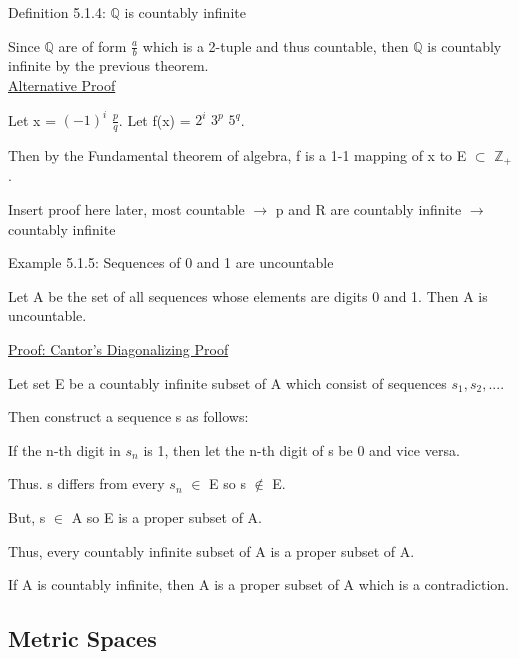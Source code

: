 { \color{blue} Definition 5.1.4: $\mathbb{Q}$ is countably infinite } 

	\begin{adjustbox}{minipage=14cm, right}
		Since $\mathbb{Q}$ are of form $\frac{a}{b}$ which is a 2-tuple and thus countable,
		then $\mathbb{Q}$ is countably infinite by the previous theorem. \\
	\end{adjustbox}
	{ \color{magenta} \underline{Alternative Proof} } 
	
		Let x = $(-1)^i$ $\frac{p}{q}$.  Let f(x) = $2^i$ $3^p$ $5^q$.

		Then by the Fundamental theorem of algebra, f is a 1-1 mapping of
		x to E $\subset$ $\mathbb{Z}_+$.

		{\color{red} Insert proof here later, most countable $\rightarrow$
		p and R are countably infinite $\rightarrow$ countably infinite} \\ 

\newpage

{ \color{purple} Example 5.1.5: Sequences of 0 and 1 are uncountable } 

	\begin{adjustbox}{minipage=14cm, right}
		Let A be the set of all sequences whose elements are digits 0 and 1.
		Then A is uncountable.
	\end{adjustbox}

{ \color{magenta} \underline{Proof: Cantor's Diagonalizing Proof} } 

	Let set E be a countably infinite subset of A which consist of sequences $s_1,s_2,...$.

	Then construct a sequence s as follows:

	\qquad If the n-th digit in $s_n$ is 1, then let the n-th digit of s be 0
	and vice versa.

	Thus. s differs from every $s_n$ $\in$ E so s $\not \in$ E.

	But, s $\in$ A so E is a proper subset of A.

	Thus, every countably infinite subset of A is a proper subset of A.

	If A is countably infinite, then A is a proper subset of A which
	is a contradiction. \\





\subsection{ Metric Spaces }

